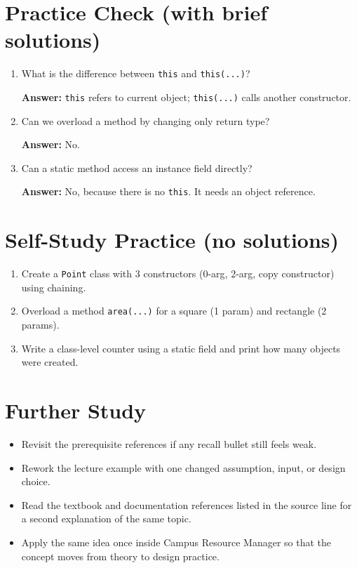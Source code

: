 \documentclass[11pt]{article}
\begin{document}
\section{Practice Check (with brief solutions)}
\begin{enumerate}
  \item What is the difference between \texttt{this} and \texttt{this(...)}?\par
  \textbf{Answer:} \texttt{this} refers to current object; \texttt{this(...)} calls another constructor.

  \item Can we overload a method by changing only return type?\par
  \textbf{Answer:} No.

  \item Can a static method access an instance field directly?\par
  \textbf{Answer:} No, because there is no \texttt{this}. It needs an object reference.
\end{enumerate}

\section{Self-Study Practice (no solutions)}
\begin{enumerate}
  \item Create a \texttt{Point} class with 3 constructors (0-arg, 2-arg, copy constructor) using chaining.
  \item Overload a method \texttt{area(...)} for a square (1 param) and rectangle (2 params).
  \item Write a class-level counter using a static field and print how many objects were created.
\end{enumerate}

\section{Further Study}
\begin{itemize}
  \item Revisit the prerequisite references if any recall bullet still feels weak.
  \item Rework the lecture example with one changed assumption, input, or design choice.
  \item Read the textbook and documentation references listed in the source line for a second explanation of the same topic.
  \item Apply the same idea once inside Campus Resource Manager so that the concept moves from theory to design practice.
\end{itemize}
\notesources{\OOPSUnitIISources}
\end{document}
